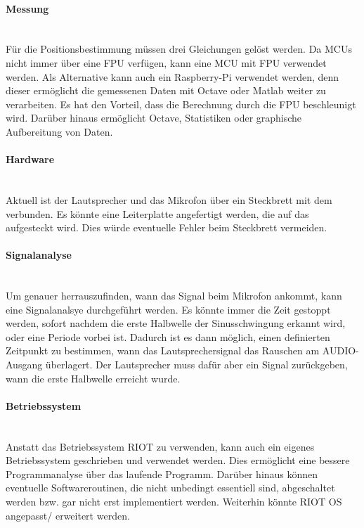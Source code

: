 \paragraph{Messung}\mbox{}\\
Für die Positionsbestimmung müssen drei Gleichungen gelöst werden. Da MCUs nicht immer über eine FPU verfügen, kann eine MCU mit FPU verwendet werden. Als Alternative kann auch ein Raspberry-Pi verwendet werden, denn dieser ermöglicht die gemessenen Daten mit Octave oder Matlab weiter zu verarbeiten. Es hat den Vorteil, dass die Berechnung durch die FPU beschleunigt wird. Darüber hinaus ermöglicht Octave, Statistiken oder graphische Aufbereitung von Daten.

\paragraph{Hardware}\mbox{}\\
Aktuell ist der Lautsprecher und das Mikrofon über ein Steckbrett mit dem \board \platz verbunden. Es könnte eine Leiterplatte angefertigt werden, die auf das \board \platz aufgesteckt wird. Dies würde eventuelle Fehler beim Steckbrett vermeiden.  

\paragraph{Signalanalyse}\mbox{}\\
Um genauer herrauszufinden, wann das Signal beim Mikrofon ankommt, kann eine Signalanalsye durchgeführt werden. Es könnte immer die Zeit gestoppt werden, sofort nachdem die erste Halbwelle der Sinusschwingung erkannt wird, oder eine Periode vorbei ist. Dadurch ist es dann möglich, einen definierten Zeitpunkt zu bestimmen, wann das Lautsprechersignal das Rauschen am \si{AUDIO}-Ausgang überlagert. Der Lautsprecher muss dafür aber ein Signal zurückgeben, wann die erste Halbwelle erreicht wurde.

\paragraph{Betriebssystem}\mbox{}\\
Anstatt das Betriebssystem RIOT zu verwenden, kann auch ein eigenes Betriebssystem geschrieben und verwendet werden. Dies ermöglicht eine bessere Programmanalyse über das laufende Programm. Darüber hinaus können eventuelle Softwareroutinen, die nicht unbedingt essentiell sind, abgeschaltet werden bzw. gar nicht erst implementiert werden. Weiterhin könnte RIOT OS angepasst/ erweitert werden.
